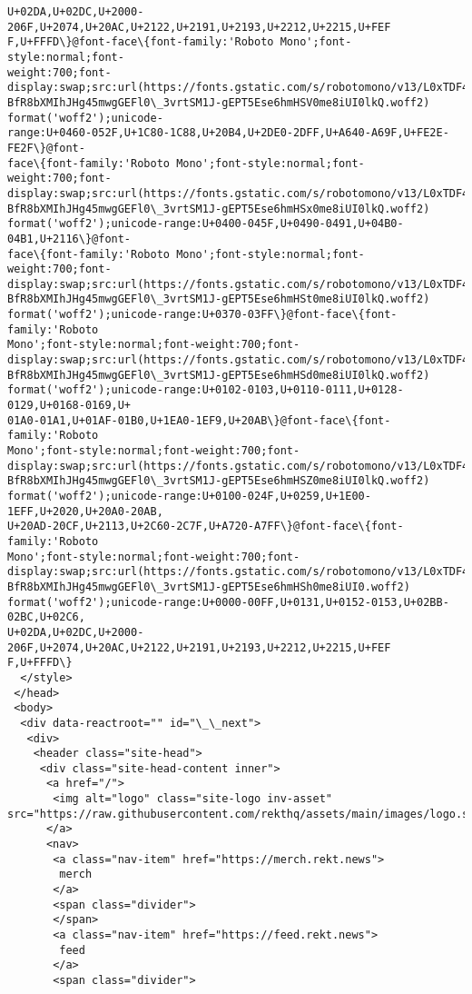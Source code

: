 \documentclass[11pt]{article}
\begin{document}
\begin{Verbatim}[commandchars=\\\{\}]
U+02DA,U+02DC,U+2000-206F,U+2074,U+20AC,U+2122,U+2191,U+2193,U+2212,U+2215,U+FEF
F,U+FFFD\}@font-face\{font-family:'Roboto Mono';font-style:normal;font-
weight:700;font-
display:swap;src:url(https://fonts.gstatic.com/s/robotomono/v13/L0xTDF4xlVMF-
BfR8bXMIhJHg45mwgGEFl0\_3vrtSM1J-gEPT5Ese6hmHSV0me8iUI0lkQ.woff2)
format('woff2');unicode-
range:U+0460-052F,U+1C80-1C88,U+20B4,U+2DE0-2DFF,U+A640-A69F,U+FE2E-FE2F\}@font-
face\{font-family:'Roboto Mono';font-style:normal;font-weight:700;font-
display:swap;src:url(https://fonts.gstatic.com/s/robotomono/v13/L0xTDF4xlVMF-
BfR8bXMIhJHg45mwgGEFl0\_3vrtSM1J-gEPT5Ese6hmHSx0me8iUI0lkQ.woff2)
format('woff2');unicode-range:U+0400-045F,U+0490-0491,U+04B0-04B1,U+2116\}@font-
face\{font-family:'Roboto Mono';font-style:normal;font-weight:700;font-
display:swap;src:url(https://fonts.gstatic.com/s/robotomono/v13/L0xTDF4xlVMF-
BfR8bXMIhJHg45mwgGEFl0\_3vrtSM1J-gEPT5Ese6hmHSt0me8iUI0lkQ.woff2)
format('woff2');unicode-range:U+0370-03FF\}@font-face\{font-family:'Roboto
Mono';font-style:normal;font-weight:700;font-
display:swap;src:url(https://fonts.gstatic.com/s/robotomono/v13/L0xTDF4xlVMF-
BfR8bXMIhJHg45mwgGEFl0\_3vrtSM1J-gEPT5Ese6hmHSd0me8iUI0lkQ.woff2)
format('woff2');unicode-range:U+0102-0103,U+0110-0111,U+0128-0129,U+0168-0169,U+
01A0-01A1,U+01AF-01B0,U+1EA0-1EF9,U+20AB\}@font-face\{font-family:'Roboto
Mono';font-style:normal;font-weight:700;font-
display:swap;src:url(https://fonts.gstatic.com/s/robotomono/v13/L0xTDF4xlVMF-
BfR8bXMIhJHg45mwgGEFl0\_3vrtSM1J-gEPT5Ese6hmHSZ0me8iUI0lkQ.woff2)
format('woff2');unicode-range:U+0100-024F,U+0259,U+1E00-1EFF,U+2020,U+20A0-20AB,
U+20AD-20CF,U+2113,U+2C60-2C7F,U+A720-A7FF\}@font-face\{font-family:'Roboto
Mono';font-style:normal;font-weight:700;font-
display:swap;src:url(https://fonts.gstatic.com/s/robotomono/v13/L0xTDF4xlVMF-
BfR8bXMIhJHg45mwgGEFl0\_3vrtSM1J-gEPT5Ese6hmHSh0me8iUI0.woff2)
format('woff2');unicode-range:U+0000-00FF,U+0131,U+0152-0153,U+02BB-02BC,U+02C6,
U+02DA,U+02DC,U+2000-206F,U+2074,U+20AC,U+2122,U+2191,U+2193,U+2212,U+2215,U+FEF
F,U+FFFD\}
  </style>
 </head>
 <body>
  <div data-reactroot="" id="\_\_next">
   <div>
    <header class="site-head">
     <div class="site-head-content inner">
      <a href="/">
       <img alt="logo" class="site-logo inv-asset"
src="https://raw.githubusercontent.com/rekthq/assets/main/images/logo.svg"/>
      </a>
      <nav>
       <a class="nav-item" href="https://merch.rekt.news">
        merch
       </a>
       <span class="divider">
       </span>
       <a class="nav-item" href="https://feed.rekt.news">
        feed
       </a>
       <span class="divider">

\end{Verbatim}
\end{document}

